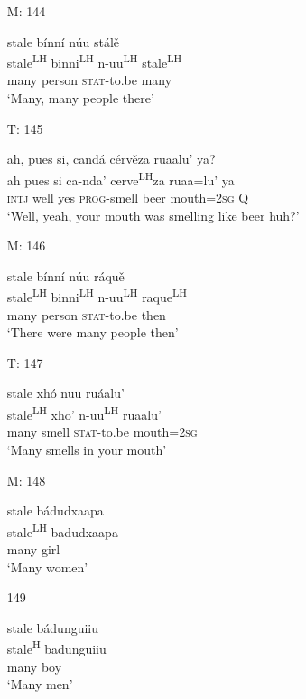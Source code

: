 \begin{itemize}
\item[M: 144]
 
\glll   stale b\'{i}nn\'{i} n\'{u}u st\'{a}l\v{e} \\
stale\textsuperscript{LH} binni\textsuperscript{LH} n-uu\textsuperscript{LH} stale\textsuperscript{LH} \\
many person \textsc{stat}-to.be many \\
\glt `Many, many people there'
 


\item[T: 145]
 
\glll   ah, pues si, cand\'{a} c\'{e}rv\v{e}za ruaalu' ya? \\
ah pues si ca-nda'  cerve\textsuperscript{LH}za ruaa=lu' ya \\
\textsc{intj} well yes \textsc{prog}-smell  beer mouth=\textsc{2sg} \textsc{Q} \\
\glt `Well, yeah, your mouth was smelling like beer huh?'
 


\item[M: 146]
 
\glll   stale b\'{i}nn\'{i} n\'{u}u r\'{a}qu\v{e} \\
stale\textsuperscript{LH} binni\textsuperscript{LH} n-uu\textsuperscript{LH} raque\textsuperscript{LH} \\
many person \textsc{stat}-to.be then \\
\glt `There were many people then'
 

\item[T: 147]
  
\glll   stale xh\'{o} nuu ru\'{a}alu' \\
stale\textsuperscript{LH}  xho' n-uu\textsuperscript{LH} ruaalu' \\
many smell \textsc{stat}-to.be mouth=\textsc{2sg} \\
\glt `Many smells in your mouth'
 


\item[M: 148]
 
\glll   stale b\'{a}dudxaapa \\
stale\textsuperscript{LH} badudxaapa \\
many girl \\
\glt `Many women'
 


\item[149]
 
\glll   stale b\'{a}dunguiiu \\
stale\textsuperscript{H} badunguiiu \\
many boy \\
\glt `Many men'
 



\end{itemize}
